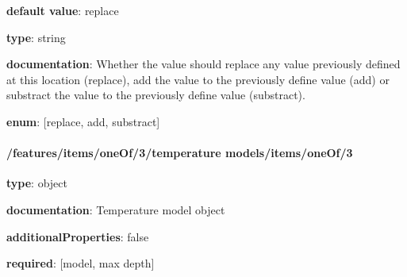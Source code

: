 \begin{itemized}
\item {\bf default value}: replace
\item {\bf type}: string
\item {\bf documentation}: Whether the value should replace any value previously defined at this location (replace), add the value to the previously define value (add) or substract the value to the previously define value (substract).
\item {\bf enum}: [replace, add, substract]\end{itemized}\paragraph{/features/items/oneOf/3/temperature models/items/oneOf/3} \begin{itemized}
\item {\bf type}: object
\item {\bf documentation}: Temperature model object
\item {\bf additionalProperties}: false
\item {\bf required}: [model, max depth]\end{itemized}
